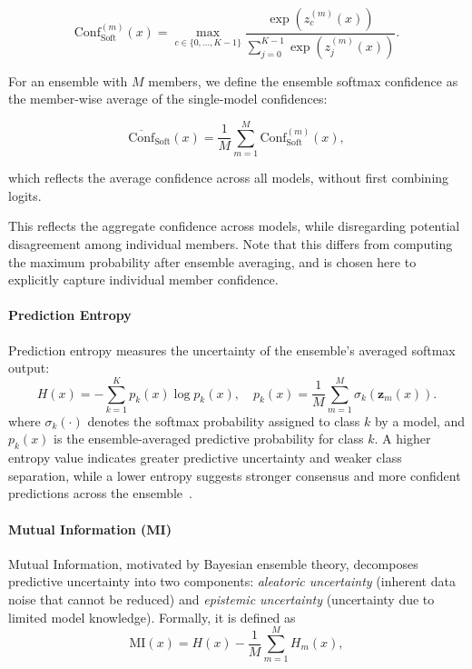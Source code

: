 \begin{equation}
\text{Conf}_{\mathrm{Soft}}^{(m)}(x) 
= \max_{c \in \{0, \ldots, K-1\}} 
\frac{\exp(z_c^{(m)}(x))}{\sum_{j=0}^{K-1} \exp(z_j^{(m)}(x))}.
\label{eq:soft_conf_single}
\end{equation}

For an ensemble with $M$ members, we define the ensemble softmax confidence as the member-wise average of the single-model confidences:

\begin{equation}
\overline{\text{Conf}}_{\mathrm{Soft}}(x) 
= \frac{1}{M} \sum_{m=1}^{M} \text{Conf}_{\mathrm{Soft}}^{(m)}(x),
\label{eq:soft_conf_ensemble}
\end{equation}

\noindent which reflects the average confidence across all models, without first combining logits.



This reflects the aggregate confidence across models, 
while disregarding potential disagreement among individual members.
Note that this differs from computing the maximum probability after ensemble averaging, 
and is chosen here to explicitly capture individual member confidence.

\paragraph{Prediction Entropy}
Prediction entropy measures the uncertainty of the ensemble’s averaged softmax output:
\begin{equation}
H(x) = - \sum_{k=1}^K p_k(x) \log p_k(x),
\quad
p_k(x) = \frac{1}{M} \sum_{m=1}^M \sigma_k(\mathbf{z}_m(x)).
\end{equation}
where $\sigma_k(\cdot)$ denotes the softmax probability assigned to class $k$ by a model, 
and $p_k(x)$ is the ensemble-averaged predictive probability for class $k$.
A higher entropy value indicates greater predictive uncertainty and weaker class separation, 
while a lower entropy suggests stronger consensus and more confident predictions across the ensemble~\cite{liu2019deep}.

\paragraph{Mutual Information (MI)}
Mutual Information, motivated by Bayesian ensemble theory, decomposes predictive uncertainty into two components: 
\emph{aleatoric uncertainty} (inherent data noise that cannot be reduced) and 
\emph{epistemic uncertainty} (uncertainty due to limited model knowledge). 
Formally, it is defined as
\begin{equation}
\text{MI}(x) = H(x) - \frac{1}{M} \sum_{m=1}^M H_m(x),
\end{equation}

